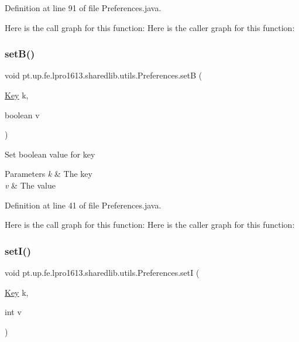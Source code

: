 Definition at line 91 of file Preferences.\+java.

Here is the call graph for this function\+:
Here is the caller graph for this function\+:
\hypertarget{classpt_1_1up_1_1fe_1_1lpro1613_1_1sharedlib_1_1utils_1_1_preferences_a746848d01972f8874044aef35a8621cb}{}\label{classpt_1_1up_1_1fe_1_1lpro1613_1_1sharedlib_1_1utils_1_1_preferences_a746848d01972f8874044aef35a8621cb} 
\subsubsection{\texorpdfstring{set\+B()}{setB()}}
{\footnotesize\ttfamily void pt.\+up.\+fe.\+lpro1613.\+sharedlib.\+utils.\+Preferences.\+setB (\begin{DoxyParamCaption}\item[{\hyperlink{interfacept_1_1up_1_1fe_1_1lpro1613_1_1sharedlib_1_1utils_1_1_preferences_1_1_key}{Key}}]{k,  }\item[{boolean}]{v }\end{DoxyParamCaption})}

Set boolean value for key


\begin{DoxyParams}{Parameters}
{\em k} & The key \\
\hline
{\em v} & The value \\
\hline
\end{DoxyParams}


Definition at line 41 of file Preferences.\+java.

Here is the call graph for this function\+:
Here is the caller graph for this function\+:
\hypertarget{classpt_1_1up_1_1fe_1_1lpro1613_1_1sharedlib_1_1utils_1_1_preferences_ad1e7c0fc12af226ce437da9ea8bd84f3}{}\label{classpt_1_1up_1_1fe_1_1lpro1613_1_1sharedlib_1_1utils_1_1_preferences_ad1e7c0fc12af226ce437da9ea8bd84f3} 
\subsubsection{\texorpdfstring{set\+I()}{setI()}}
{\footnotesize\ttfamily void pt.\+up.\+fe.\+lpro1613.\+sharedlib.\+utils.\+Preferences.\+setI (\begin{DoxyParamCaption}\item[{\hyperlink{interfacept_1_1up_1_1fe_1_1lpro1613_1_1sharedlib_1_1utils_1_1_preferences_1_1_key}{Key}}]{k,  }\item[{int}]{v }\end{DoxyParamCaption})}

